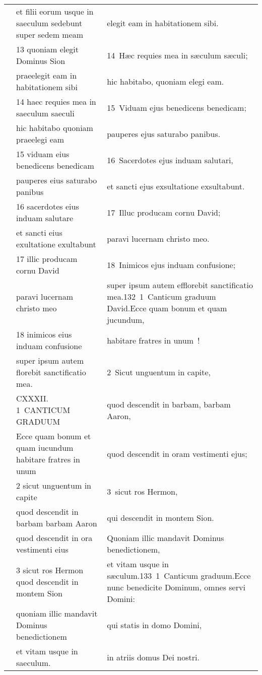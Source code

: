 \documentclass{article}
\begin{document}
\begin{longtable}{@{}p{}p{}p{}@{}}
	&	et filii eorum usque in saeculum sedebunt super sedem meam	&	elegit eam in habitationem sibi.	\\
	&	13 quoniam elegit Dominus Sion	&	14 Hæc requies mea in sæculum sæculi;	\\
	&	praeelegit eam in habitationem sibi	&	hic habitabo, quoniam elegi eam.	\\
	&	14 haec requies mea in saeculum saeculi	&	15 Viduam ejus benedicens benedicam;	\\
	&	hic habitabo quoniam praeelegi eam	&	pauperes ejus saturabo panibus.	\\
	&	15 viduam eius benedicens benedicam	&	16 Sacerdotes ejus induam salutari,	\\
	&	pauperes eius saturabo panibus	&	et sancti ejus exsultatione exsultabunt.	\\
	&	16 sacerdotes eius induam salutare	&	17 Illuc producam cornu David;	\\
	&	et sancti eius exultatione exultabunt	&	paravi lucernam christo meo.	\\
	&	17 illic producam cornu David	&	18 Inimicos ejus induam confusione;	\\
	&	paravi lucernam christo meo	&	super ipsum autem efflorebit sanctificatio mea.132 1 Canticum graduum David.Ecce quam bonum et quam jucundum,	\\
	&	18 inimicos eius induam confusione	&	habitare fratres in unum !	\\
	&	super ipsum autem florebit sanctificatio mea.	&	2 Sicut unguentum in capite,	\\
	&	CXXXII. 1 CANTICUM GRADUUM	&	quod descendit in barbam, barbam Aaron,	\\
	&	Ecce quam bonum et quam iucundum habitare fratres in unum	&	quod descendit in oram vestimenti ejus;	\\
	&	2 sicut unguentum in capite	&	3 sicut ros Hermon,	\\
	&	quod descendit in barbam barbam Aaron	&	qui descendit in montem Sion.	\\
	&	quod descendit in ora vestimenti eius	&	Quoniam illic mandavit Dominus benedictionem,	\\
	&	3 sicut ros Hermon quod descendit in montem Sion	&	et vitam usque in sæculum.133 1 Canticum graduum.Ecce nunc benedicite Dominum, omnes servi Domini:	\\
	&	quoniam illic mandavit Dominus benedictionem	&	qui statis in domo Domini,	\\
	&	et vitam usque in saeculum.	&	in atriis domus Dei nostri.	\\

\end{longtable}
\end{document}

